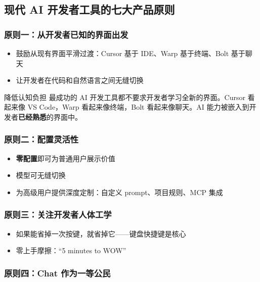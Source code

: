 \documentclass[a4paper]{article}
\begin{document}
\subsection{现代 AI 开发者工具的七大产品原则}

\subsubsection{原则一：从开发者已知的界面出发}

\begin{itemize}
    \item 鼓励从现有界面平滑过渡：Cursor 基于 IDE、Warp 基于终端、Bolt 基于聊天
    \item 让开发者在代码和自然语言之间无缝切换
\end{itemize}

\begin{importantbox}{降低认知负担}
最成功的 AI 开发工具都不要求开发者学习全新的界面。Cursor 看起来像 VS Code，Warp 看起来像终端，Bolt 看起来像聊天。AI 能力被嵌入到开发者\textbf{已经熟悉}的界面中。
\end{importantbox}

\subsubsection{原则二：配置灵活性}

\begin{itemize}
    \item \textbf{零配置}即可为普通用户展示价值
    \item 模型可无缝切换
    \item 为高级用户提供深度定制：自定义 prompt、项目规则、MCP 集成
\end{itemize}

\subsubsection{原则三：关注开发者人体工学}

\begin{itemize}
    \item 如果能省掉一次按键，就省掉它——键盘快捷键是核心
    \item 零上手摩擦：``5 minutes to WOW''
\end{itemize}

\subsubsection{原则四：Chat 作为一等公民}
\end{document}

